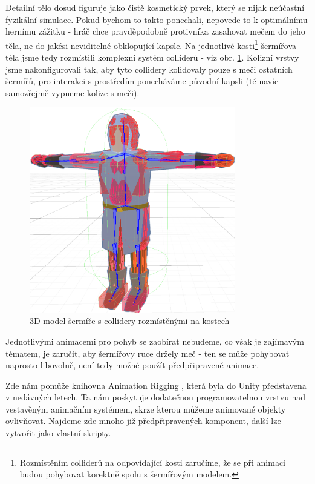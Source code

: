 Detailní tělo dosud figuruje jako čistě kosmetický prvek, který se nijak neúčastní fyzikální simulace. Pokud bychom to takto ponechali, nepovede to k optimálnímu hernímu zážitku - hráč chce pravděpodobně protivníka zasahovat mečem do jeho těla, ne do jakési neviditelné obklopující kapsle. Na jednotlivé kosti\footnote{Rozmístěním colliderů na odpovídající kosti zaručíme, že se při animaci budou pohybovat korektně spolu s šermířovým modelem.} šermířova těla jsme tedy rozmístili komplexní systém colliderů - viz obr. \ref{obr05:swordsmanDetailedColliders}. Kolizní vrstvy jsme nakonfigurovali tak, aby tyto collidery kolidovaly pouze s meči ostatních šermířů, pro interakci s prostředím ponecháváme původní kapsli (té navíc samozřejmě vypneme kolize s meči). 

\begin{figure}[ht]\centering
  \center
  \includegraphics[width=90mm]{../img/swordsmanBodyColliders.png}
  \caption{3D model šermíře s collidery rozmístěnými na kostech}
  \label{obr05:swordsmanDetailedColliders}
\end{figure} 

Jednotlivými animacemi pro pohyb se zaobírat nebudeme, co však je zajímavým tématem, je zaručit, aby šermířovy ruce držely meč - ten se může pohybovat naprosto libovolně, není tedy možné použít předpřipravené animace. 

Zde nám pomůže knihovna Animation Rigging \cite{AnimationRigging}, která byla do Unity představena v nedávných letech. Ta nám poskytuje dodatečnou programovatelnou vrstvu nad vestavěným animačním systémem, skrze kterou můžeme animované objekty ovlivňovat. Najdeme zde mnoho již předpřipravených komponent, další lze vytvořit jako vlastní skripty.

